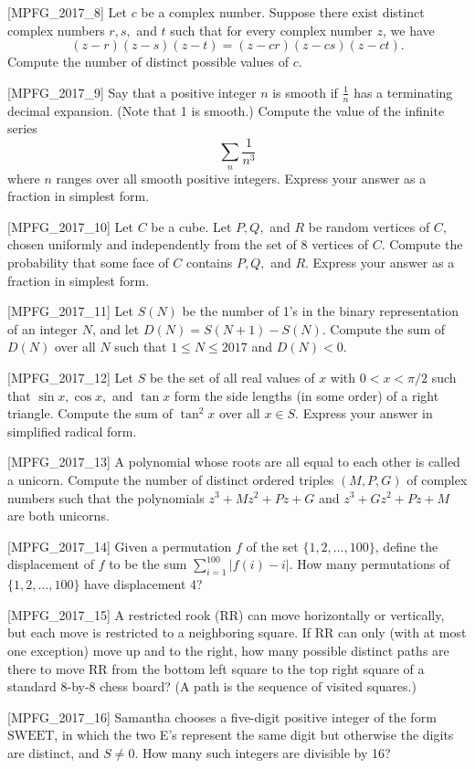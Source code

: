 [MPFG_2017_8]
Let $c$ be a complex number. Suppose there exist distinct complex numbers $r, s,$ and $t$ such that for every complex number $z$, we have
$$(z-r)(z-s)(z-t) = (z-cr)(z-cs)(z-ct).$$
Compute the number of distinct possible values of $c$.

[MPFG_2017_9]
Say that a positive integer $n$ is smooth if $\frac{1}{n}$ has a terminating decimal expansion. (Note that 1 is smooth.) Compute the value of the infinite series
$$\sum_{n} \frac{1}{n^3}$$
where $n$ ranges over all smooth positive integers. Express your answer as a fraction in simplest form.

[MPFG_2017_10]
Let $C$ be a cube. Let $P, Q,$ and $R$ be random vertices of $C$, chosen uniformly and independently from the set of 8 vertices of $C$. Compute the probability that some face of $C$ contains $P, Q,$ and $R$. Express your answer as a fraction in simplest form.

[MPFG_2017_11]
Let $S(N)$ be the number of 1's in the binary representation of an integer $N$, and let $D(N) = S(N+1) - S(N)$. Compute the sum of $D(N)$ over all $N$ such that $1 \le N \le 2017$ and $D(N) < 0$.

[MPFG_2017_12]
Let $S$ be the set of all real values of $x$ with $0 < x < \pi/2$ such that $\sin x, \cos x,$ and $\tan x$ form the side lengths (in some order) of a right triangle. Compute the sum of $\tan^2 x$ over all $x \in S$. Express your answer in simplified radical form.

[MPFG_2017_13]
A polynomial whose roots are all equal to each other is called a unicorn. Compute the number of distinct ordered triples $(M, P, G)$ of complex numbers such that the polynomials $z^3 + Mz^2 + Pz + G$ and $z^3 + Gz^2 + Pz + M$ are both unicorns.

[MPFG_2017_14]
Given a permutation $f$ of the set $\{1,2,\dots,100\}$, define the displacement of $f$ to be the sum $\sum_{i=1}^{100} |f(i)-i|$. How many permutations of $\{1,2,\dots,100\}$ have displacement 4?

[MPFG_2017_15]
A restricted rook (RR) can move horizontally or vertically, but each move is restricted to a neighboring square. If RR can only (with at most one exception) move up and to the right, how many possible distinct paths are there to move RR from the bottom left square to the top right square of a standard 8-by-8 chess board? (A path is the sequence of visited squares.)

[MPFG_2017_16]
Samantha chooses a five-digit positive integer of the form $\text{SWEET}$, in which the two E's represent the same digit but otherwise the digits are distinct, and $S \ne 0$. How many such integers are divisible by 16?

